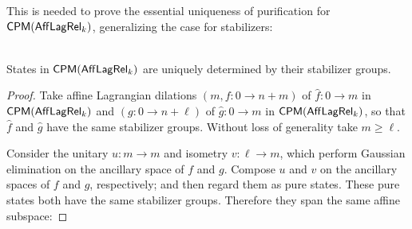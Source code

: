 This is needed to prove the essential uniqueness of purification for $\mathsf{CPM}(\mathsf{Aff}\mathsf{Lag}\mathsf{Rel}_k)$, generalizing the case for stabilizers:

\begin{proposition}~\\
\label{prop:uniqueness}
States in $\mathsf{CPM}(\mathsf{Aff}\mathsf{Lag}\mathsf{Rel}_k)$ are uniquely determined by their stabilizer groups.
\end{proposition}
\begin{proof}

Take affine Lagrangian dilations $(m,f:0\to n+m)$ of $\hat f:0\to m$ in $\mathsf{CPM}(\mathsf{Aff}\mathsf{Lag}\mathsf{Rel}_k)$ and $(g:0\to n+\ell)$ of $\hat g:0\to m$ in $\mathsf{CPM}(\mathsf{Aff}\mathsf{Lag}\mathsf{Rel}_k)$, so that $\hat f$ and $\hat g$ have the same stabilizer groups. Without loss of generality take $m\geq \ell$. %
%
%


%
%

Consider the unitary  $u:m\to m$  and isometry $v:\ell\to m$, which perform Gaussian elimination on the ancillary space of $f$ and $g$.  Compose $u$ and $v$ on the ancillary spaces of $f$ and $g$, respectively; and then regard them as pure states.  These pure states both have the same stabilizer groups.  Therefore they span the same affine subspace:


\end{proof}
